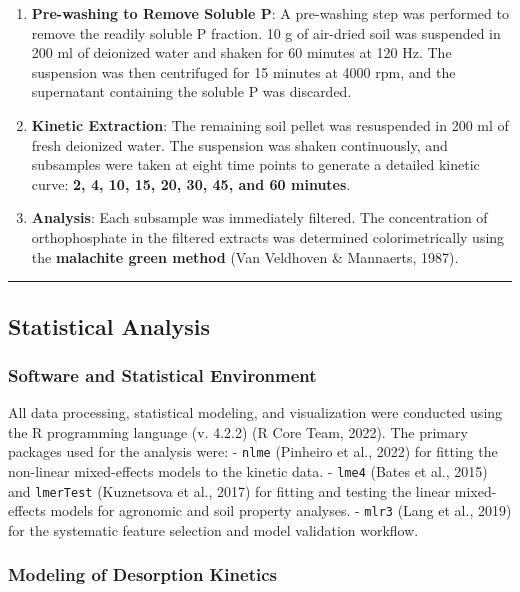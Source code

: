 \documentclass[
  a4paper,
]{article}
\begin{document}
\begin{enumerate}
\def\labelenumi{\arabic{enumi}.}
\item
  \textbf{Pre-washing to Remove Soluble P}: A pre-washing step was
  performed to remove the readily soluble P fraction. 10 g of air-dried
  soil was suspended in 200 ml of deionized water and shaken for 60
  minutes at 120 Hz. The suspension was then centrifuged for 15 minutes
  at 4000 rpm, and the supernatant containing the soluble P was
  discarded.
\item
  \textbf{Kinetic Extraction}: The remaining soil pellet was resuspended
  in 200 ml of fresh deionized water. The suspension was shaken
  continuously, and subsamples were taken at eight time points to
  generate a detailed kinetic curve: \textbf{2, 4, 10, 15, 20, 30, 45,
  and 60 minutes}.
\item
  \textbf{Analysis}: Each subsample was immediately filtered. The
  concentration of orthophosphate in the filtered extracts was
  determined colorimetrically using the \textbf{malachite green method}
  (Van Veldhoven \& Mannaerts, 1987).
\end{enumerate}

\begin{center}\rule{0.5\linewidth}{0.5pt}\end{center}

\subsection{Statistical Analysis}\label{sec-statistical-analysis}

\subsubsection{Software and Statistical
Environment}\label{software-and-statistical-environment}

All data processing, statistical modeling, and visualization were
conducted using the R programming language (v. 4.2.2) (R Core Team,
2022). The primary packages used for the analysis were: - \texttt{nlme}
(Pinheiro et al., 2022) for fitting the non-linear mixed-effects models
to the kinetic data. - \texttt{lme4} (Bates et al., 2015) and
\texttt{lmerTest} (Kuznetsova et al., 2017) for fitting and testing the
linear mixed-effects models for agronomic and soil property analyses. -
\texttt{mlr3} (Lang et al., 2019) for the systematic feature selection
and model validation workflow.

\subsubsection{Modeling of Desorption
Kinetics}\label{sec-modeling-of-desorption-kinetics}
\end{document}
